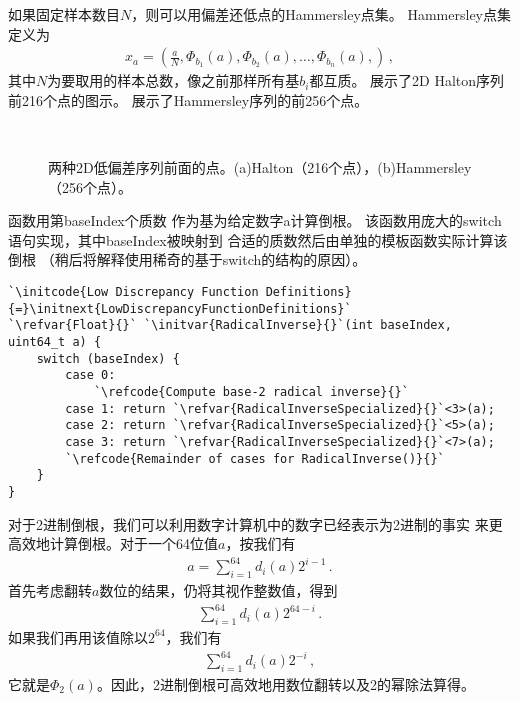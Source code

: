 如果固定样本数目$N$，则可以用偏差还低点的Hammersley点集。
Hammersley点集定义为
\begin{align*}
    x_a=\left(\frac{a}{N},\Phi_{b_1}(a),\Phi_{b_2}(a),\ldots,\Phi_{b_n}(a),\right)\, ,
\end{align*}
其中$N$为要取用的样本总数，像之前那样所有基$b_i$都互质。
展示了2D Halton序列前216个点的图示。
展示了Hammersley序列的前256个点。
\begin{figure}[htbp]
    \centering
    \,
    \caption{两种2D低偏差序列前面的点。(a)Halton（216个点），(b)Hammersley（256个点）。}
    \label{fig:7.25}
\end{figure}

函数用第{\ttfamily baseIndex}个质数
作为基为给定数字{\ttfamily a}计算倒根。
该函数用庞大的{\ttfamily switch}语句实现，其中{\ttfamily baseIndex}被映射到
合适的质数然后由单独的模板函数实际计算该倒根
（稍后将解释使用稀奇的基于{\ttfamily switch}的结构的原因）。
\begin{lstlisting}
`\initcode{Low Discrepancy Function Definitions}{=}\initnext{LowDiscrepancyFunctionDefinitions}`
`\refvar{Float}{}` `\initvar{RadicalInverse}{}`(int baseIndex, uint64_t a) {
    switch (baseIndex) {
        case 0:
            `\refcode{Compute base-2 radical inverse}{}`
        case 1: return `\refvar{RadicalInverseSpecialized}{}`<3>(a);
        case 2: return `\refvar{RadicalInverseSpecialized}{}`<5>(a);
        case 3: return `\refvar{RadicalInverseSpecialized}{}`<7>(a);
        `\refcode{Remainder of cases for RadicalInverse()}{}`
    }
}
\end{lstlisting}

对于2进制倒根，我们可以利用数字计算机中的数字已经表示为2进制的事实
来更高效地计算倒根。对于一个64位值$a$，按我们有
\begin{align*}
    a=\sum\limits_{i=1}^{64}{d_i(a)2^{i-1}}\, .
\end{align*}
首先考虑翻转$a$数位的结果，仍将其视作整数值，得到
\begin{align*}
    \sum\limits_{i=1}^{64}{d_i(a)2^{64-i}}\, .
\end{align*}
如果我们再用该值除以$2^{64}$，我们有
\begin{align*}
    \sum\limits_{i=1}^{64}{d_i(a)2^{-i}}\, ,
\end{align*}
它就是$\Phi_2(a)$。因此，2进制倒根可高效地用数位翻转以及2的幂除法算得。

